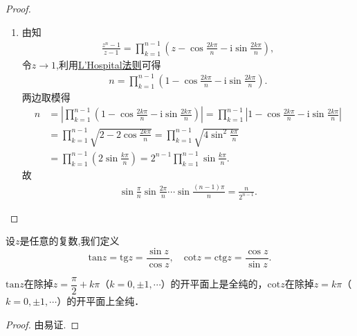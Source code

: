 \documentclass[../../main.tex]{subfiles}%
\begin{document}
\begin{proof}
\begin{enumerate}[(1)]
\item 由知
\begin{align*}
\frac{z^n-1}{z-1}=\prod_{k=1}^{n-1}{\left( z-\cos \frac{2k\pi}{n}-\mathrm{i}\sin \frac{2k\pi}{n} \right)},
\end{align*}
令$z\to 1$,利用\hyperref[theorem:L'Hospital(洛必达)法则]{L'Hospital法则}可得
\begin{align*}
n = \prod_{k=1}^{n-1}{\left( 1-\cos \frac{2k\pi}{n}-\mathrm{i}\sin \frac{2k\pi}{n} \right)}.
\end{align*}
两边取模得
\begin{align*}
n&=\left| \prod_{k=1}^{n-1}{\left( 1-\cos \frac{2k\pi}{n}-\mathrm{i}\sin \frac{2k\pi}{n} \right)} \right|=\prod_{k=1}^{n-1}{\left| 1-\cos \frac{2k\pi}{n}-\mathrm{i}\sin \frac{2k\pi}{n} \right|}
\\
&=\prod_{k=1}^{n-1}{\sqrt{2-2\cos \frac{2k\pi}{n}}}=\prod_{k=1}^{n-1}{\sqrt{4\sin ^2\frac{k\pi}{n}}}
\\
&=\prod_{k=1}^{n-1}{\left( 2\sin \frac{k\pi}{n} \right)}=2^{n-1}\prod_{k=1}^{n-1}{\sin \frac{k\pi}{n}}.
\end{align*}
故
\begin{align*}
\sin\frac{\pi}{n}\sin\frac{2\pi}{n}\cdots\sin\frac{(n-1)\pi}{n}=\frac{n}{2^{n-1}}.
\end{align*}

\end{enumerate}

\end{proof}

\begin{definition}
设$z$是任意的复数,我们定义
\[
\text{tan} z=\text{tg} z = \dfrac{\sin z}{\cos z},
\quad 
\text{cot} z=\text{ctg} z = \dfrac{\cos z}{\sin z}.
\]
\end{definition}

\begin{theorem}
$\text{tan} z$在除掉$z = \dfrac{\pi}{2} + k\pi$（$k = 0, \pm 1, \cdots$）的开平面上是全纯的，$\text{cot} z$在除掉$z = k\pi$（$k = 0, \pm 1, \cdots$）的开平面上全纯．
\end{theorem}
\begin{proof}

由易证.

\end{proof}
\end{document}
